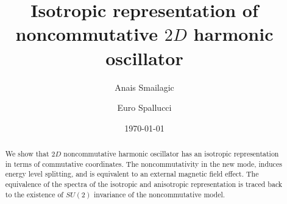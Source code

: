\documentclass[a4paper,aps,prd,preprint]{revtex4}
\begin{document}
\title{Isotropic representation of noncommutative $2D$ harmonic 
oscillator}

\author{Anais Smailagic}
\author{Euro Spallucci}
\date{\today}


\begin{abstract}
We show that  $2D$ noncommutative harmonic oscillator has an isotropic
representation in terms of commutative coordinates.
The noncommutativity in the new mode, induces energy level 
splitting, and is equivalent to an external magnetic field effect. The
equivalence of the spectra of the isotropic and anisotropic representation
is traced back to the existence of  $SU(2)$ invariance of the noncommutative
model.
\end{abstract}

\maketitle
\end{document}
